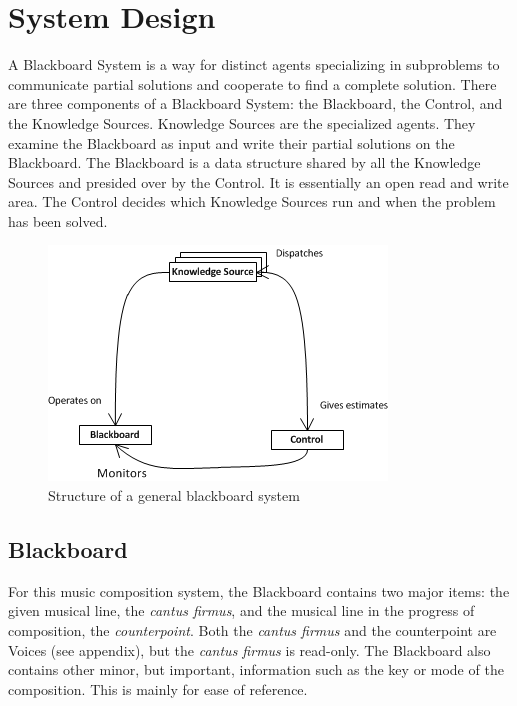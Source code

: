 \section{System Design} %

A Blackboard System is a way for distinct agents specializing in subproblems to communicate partial solutions and cooperate to find a complete solution.
There are three components of a Blackboard System: the Blackboard, the Control, and the Knowledge Sources.
Knowledge Sources are the specialized agents. They examine the Blackboard as input and write their partial solutions on the Blackboard.
The Blackboard is a data structure shared by all the Knowledge Sources and presided over by the Control. It is essentially an open read and write area.
The Control decides which Knowledge Sources run and when the problem has been solved.

\begin{figure}[h]
\centering
	\includegraphics[keepaspectratio=true]{blackboard-system-diagram.png}
\caption{Structure of a general blackboard system}
\end{figure}

\subsection{Blackboard} %

For this music composition system, the Blackboard contains two major items: the given musical line, the \emph{cantus firmus}, and the musical line in the progress of composition, the \emph{counterpoint}.
Both the \emph{cantus firmus} and the counterpoint are Voices (see appendix), but the \emph{cantus firmus} is read-only.
The Blackboard also contains other minor, but important, information such as the key or mode of the composition. This is mainly for ease of reference.

